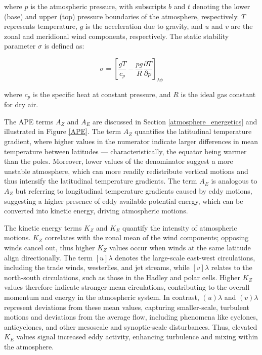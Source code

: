 where $p$ is the atmospheric pressure, with subscripts $b$ and $t$ denoting the lower (base) and upper (top) pressure boundaries of the atmosphere, respectively. $T$ represents temperature, $g$ is the acceleration due to gravity, and $u$ and $v$ are the zonal and meridional wind components, respectively. The static stability parameter $\sigma$ is defined as:


\begin{equation}
    \sigma = \left[\frac{gT}{c_p}-\frac{pg}{R}\frac{\partial T}{\partial p}\right]_{\lambda \phi}
\end{equation}

where $c_p$ is the specific heat at constant pressure, and $R$ is the ideal gas constant for dry air.

The APE terms $A_Z$ and $A_E$ are discussed in Section \ref{atmosphere_energetics} and illustrated in Figure \ref{APE}. The term $A_Z$ quantifies the latitudinal temperature gradient, where higher values in the numerator indicate larger differences in mean temperature between latitudes — characteristically, the equator being warmer than the poles. Moreover, lower values of the denominator suggest a more unstable atmosphere, which can more readily redistribute vertical motions and thus intensify the latitudinal temperature gradients. The term $A_E$ is analogous to $A_Z$ but referring to longitudinal temperature gradients caused by eddy motions, suggesting a higher presence of eddy available potential energy, which can be converted into kinetic energy, driving atmospheric motions.

The kinetic energy terms $K_Z$ and $K_E$ quantify the intensity of atmospheric motions. $K_Z$ correlates with the zonal mean of the wind components; opposing winds cancel out, thus higher $K_Z$ values occur when winds at the same latitude align directionally. The term $[u]\lambda$ denotes the large-scale east-west circulations, including the trade winds, westerlies, and jet streams, while $[v]\lambda$ relates to the north-south circulations, such as those in the Hadley and polar cells. Higher $K_Z$ values therefore indicate stronger mean circulations, contributing to the overall momentum and energy in the atmospheric system. In contrast, $(u)\lambda$ and $(v)\lambda$ represent deviations from these mean values, capturing smaller-scale, turbulent motions and deviations from the average flow, including phenomena like cyclones, anticyclones, and other mesoscale and synoptic-scale disturbances. Thus, elevated $K_E$ values signal increased eddy activity, enhancing turbulence and mixing within the atmosphere.

